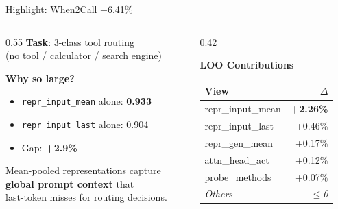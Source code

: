 \documentclass[aspectratio=169,14pt]{beamer}
\begin{document}
\begin{frame}{Highlight: When2Call +6.41\%}

\begin{columns}[T]
\begin{column}{0.55\textwidth}
\textbf{Task}: 3-class tool routing\\
{\small (no tool / calculator / search engine)}

\vspace{1em}
\textbf{Why so large?}
\begin{itemize}
    \item \texttt{repr\_input\_mean} alone: \textbf{0.933}
    \item \texttt{repr\_input\_last} alone: 0.904
    \item Gap: \textcolor{wingreen}{\textbf{+2.9\%}}
\end{itemize}

\vspace{0.5em}
Mean-pooled representations capture\\
\textbf{global prompt context} that\\
last-token misses for routing decisions.

\end{column}
\begin{column}{0.42\textwidth}

\centering
\textbf{LOO Contributions}

\vspace{0.5em}
\begin{tabular}{l r}
\toprule
\textbf{View} & \textbf{$\Delta$} \\
\midrule
repr\_input\_mean & \textcolor{wingreen}{\textbf{+2.26\%}} \\
repr\_input\_last & +0.46\% \\
repr\_gen\_mean & +0.17\% \\
attn\_head\_act & +0.12\% \\
probe\_methods & +0.07\% \\
\midrule
\textit{Others} & \textit{$\leq$0} \\
\bottomrule
\end{tabular}

\end{column}
\end{columns}

\end{frame}
\end{document}
